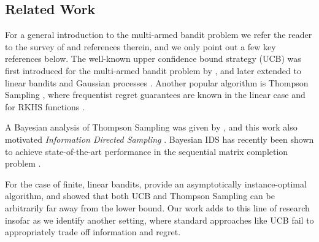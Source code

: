 \subsection{Related Work}
For a general introduction to the multi-armed bandit problem we refer the reader to the survey of \cite{BubeckRegretAnalysisStochastic2012} and references therein, and we only point out a few key references below. The well-known upper confidence bound strategy (UCB) was first introduced for the multi-armed bandit problem by \cite{AuerFinitetimeanalysismultiarmed2002}, and later extended to linear bandits \cite[]{DaniStochasticlinearoptimization2008, Abbasi-YadkoriImprovedAlgorithmsLinear2011} and Gaussian processes \cite[]{SrinivasGaussianProcessOptimization2010, Abbasi-YadkoriOnlinelearninglinearly2012, ChowdhuryKernelizedMultiarmedBandits2017}. 
Another popular algorithm is Thompson Sampling \cite[]{ThompsonLikelihoodthatOne1933}, where frequentist regret guarantees are known in the linear case \cite[]{AgrawalThompsonSamplingContextual2013, AbeilleLinearThompsonSampling2017} and for RKHS functions \citep{ChowdhuryKernelizedMultiarmedBandits2017}.

A Bayesian analysis of Thompson Sampling was given by \cite{RussoinformationtheoreticanalysisThompson2016}, and this work also motivated \emph{Information Directed Sampling} \cite[IDS,][]{RussoLearningOptimizeInformationDirected2014}. Bayesian IDS has recently been shown to achieve state-of-the-art performance in the sequential matrix completion problem \cite[]{MarsdenSequentialMatrixCompletion2017}.

For the case of finite, linear bandits, \cite{LattimoreEndOptimismAsymptotic2017} provide an asymptotically instance-optimal algorithm, and showed that both UCB and Thompson Sampling can be arbitrarily far away from the lower bound. Our work adds to this line of research insofar as we identify another setting, where standard approaches like UCB fail to appropriately trade off information and regret. %

